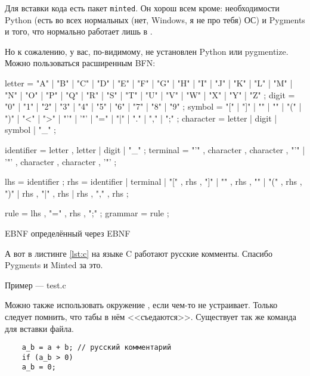 \else

Для вставки кода есть пакет \texttt{minted}. Он хорош всем кроме: необходимости Python (есть во всех нормальных (нет, Windows, я не про тебя) ОС) и Pygments и того, что нормально работает лишь в \XeLaTeX.

\ifdefined\NoMinted
Но к сожалению, у вас, по-видимому, не установлен Python или pygmentize.
\else
Можно пользоваться расширенным BFN:

\begin{listing}[H]
    \begin{ebnfcode}
        letter = "A" | "B" | "C" | "D" | "E" | "F" | "G"
        | "H" | "I" | "J" | "K" | "L" | "M" | "N"
        | "O" | "P" | "Q" | "R" | "S" | "T" | "U"
        | "V" | "W" | "X" | "Y" | "Z" ;
        digit = "0" | "1" | "2" | "3" | "4" | "5" | "6" | "7" | "8" | "9" ;
        symbol = "[" | "]" | "{" | "}" | "(" | ")" | "<" | ">"
        | "'" | '"' | "=" | "|" | "." | "," | ";" ;
        character = letter | digit | symbol | "_" ;

        identifier = letter , { letter | digit | "_" } ;
        terminal = "'" , character , { character } , "'"
        | '"' , character , { character } , '"' ;

        lhs = identifier ;
        rhs = identifier
        | terminal
        | "[" , rhs , "]"
        | "{" , rhs , "}"
        | "(" , rhs , ")"
        | rhs , "|" , rhs
        | rhs , "," , rhs ;

        rule = lhs , "=" , rhs , ";" ;
        grammar = { rule } ;
    \end{ebnfcode}
    \caption{EBNF определённый через EBNF}
    \label{lst:ebnf}
\end{listing}

А вот в листинге \ref{lst:c} на языке C работают русские комменты. Спасибо Pygments и Minted за это.

\begin{listing}[H]
    \caption{Пример — test.c}
\end{listing}
\label{lst:c}

\fi
\fi




Можно также использовать окружение , если  чем-то не
устраивает. Только следует помнить, что табы в нём <<съедаются>>. Существует так же команда  для вставки файла.

\begin{verbatim}
    a_b = a + b; // русский комментарий
    if (a_b > 0)
    a_b = 0;
\end{verbatim}

